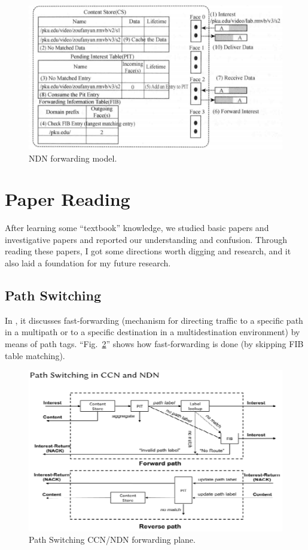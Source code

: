 \documentclass[conference]{IEEEtran}
\begin{document}
\begin{figure}[htbp]
\centerline{\includegraphics[scale=0.65]{fig_fm.png}}
\caption{NDN forwarding model.}
\label{fig_fm}
\end{figure}

\section{Paper Reading}
After learning some “textbook” knowledge, we studied basic papers and investigative papers and reported our understanding and confusion. Through reading these papers, I got some directions worth digging and research, and it also laid a foundation for my future research.

\subsection{Path Switching}\label{PS}
In \cite{b2}, it discusses fast-forwarding (mechanism for directing traffic to a specific path in a multipath or to a specific destination in a multidestination environment) by means of path tags.
``Fig.~\ref{fig_pl}'' shows how fast-forwarding is done (by skipping FIB table matching).
\begin{figure}[htbp]
\centerline{\includegraphics[scale=0.75]{fig_pl.png}}
\caption{Path Switching CCN/NDN forwarding plane.}
\label{fig_pl}
\end{figure}
\end{document}
